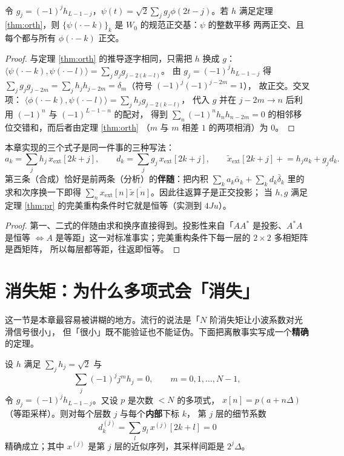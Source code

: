 \begin{theorem}[小波滤波器与 $W_0$ 的基]
\label{thm:waveletfilter}
令 $g_j=(-1)^j h_{L-1-j}$，$\psi(t)=\sqrt2\sum_j g_j\phi(2t-j)$。若 $h$ 满足定理
\ref{thm:orth}，则 $\{\psi(\cdot-k)\}_k$ 是 $W_0$ 的规范正交基：$\psi$ 的整数平移
两两正交、且每个都与所有 $\phi(\cdot-k)$ 正交。
\end{theorem}

\begin{proof}
与定理 \ref{thm:orth} 的推导逐字相同，只需把 $h$ 换成 $g$：
$\langle\psi(\cdot-k),\psi(\cdot-l)\rangle=\sum_jg_jg_{j-2(k-l)}$。
由 $g_j=(-1)^jh_{L-1-j}$ 得
$\sum_jg_jg_{j-2m}=\sum_jh_jh_{j-2m}=\delta_m$（符号 $(-1)^{j}(-1)^{j-2m}=1$），
故正交。交叉项：
$\langle\phi(\cdot-k),\psi(\cdot-l)\rangle=\sum_jh_jg_{j-2(k-l)}$，
代入 $g$ 并在 $j-2m\to n$ 后利用 $(-1)^n$ 与 $(-1)^{L-1-n}$ 的配对，
得到 $\sum_n(-1)^nh_nh_{n-2m}=0$ 的相邻移位交错和，而后者由定理 \ref{thm:orth}
（$m$ 与 $m$ 相差 $1$ 的两项相消）为 $0$。
\end{proof}

\begin{corollary}[离散滤波器组是伴随对]
\label{cor:filterbank}
本章实现的三个式子是同一件事的三种写法：
\[
a_k=\sum_j h_j\,x_{\text{ext}}[2k+j],\qquad
d_k=\sum_j g_j\,x_{\text{ext}}[2k+j],\qquad
\tilde x_{\text{ext}}[2k+j]\mathrel{+}=h_ja_k+g_jd_k .
\]
第三条（合成）恰好是前两条（分析）的\textbf{伴随}：把内积
$\sum_k a_k\bar\alpha_k+\sum_kd_k\bar\delta_k$ 里的求和次序换一下即得
$\sum_n x_{\text{ext}}[n]\overline{\tilde x[n]}$。因此往返算子是正交投影；
当 $h,g$ 满足定理 \ref{thm:pr} 的完美重构条件时它就是恒等（实测到 $4Ju$）。
\end{corollary}

\begin{proof}
第一、二式的伴随由求和换序直接得到。投影性来自「$A A^{*}$ 是投影、$A^{*}A$ 是恒等
$\iff A$ 是等距」这一对标准事实；完美重构条件下每一层的 $2\times2$ 多相矩阵是酉矩阵，
所以每层都等距，往返即恒等。
\end{proof}

\section{消失矩：为什么多项式会「消失」}

这一节是本章最容易被讲糊的地方。流行的说法是「$N$ 阶消失矩让小波系数对光滑信号很小」，
但「很小」既不能验证也不能证伪。下面把离散事实写成一个\textbf{精确}的定理。

\begin{theorem}
\label{thm:vm}
设 $h$ 满足 $\sum_jh_j=\sqrt2$ 与
\[
\sum_j(-1)^j j^m h_j=0,\qquad m=0,1,\dots,N-1,
\]
令 $g_j=(-1)^jh_{L-1-j}$。又设 $p$ 是次数 $<N$ 的多项式，
$x[n]=p(a+n\Delta)$（等距采样）。则对每个层数 $j$ 与每个\textbf{内部}下标 $k$，
第 $j$ 层的细节系数
\[
d^{(j)}_k=\sum_l g_l\,x^{(j)}[2k+l]=0
\]
精确成立；其中 $x^{(j)}$ 是第 $j$ 层的近似序列，其采样间距是 $2^j\Delta$。
\end{theorem}

